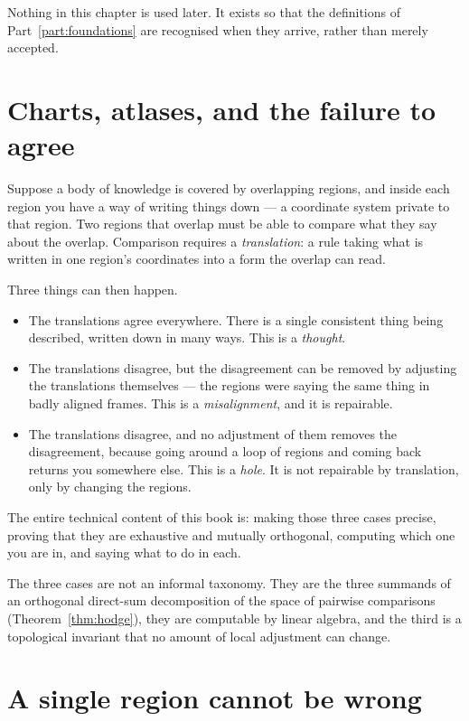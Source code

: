 Nothing in this chapter is used later. It exists so that the definitions of
Part~\ref{part:foundations} are recognised when they arrive, rather than
merely accepted.

\section{Charts, atlases, and the failure to agree}

\begin{intu}\Intu
Suppose a body of knowledge is covered by overlapping regions, and inside each
region you have a way of writing things down --- a coordinate system private
to that region. Two regions that overlap must be able to compare what they
say about the overlap. Comparison requires a \emph{translation}: a rule taking
what is written in one region's coordinates into a form the overlap can read.

Three things can then happen.
\begin{itemize}
  \item The translations agree everywhere. There is a single consistent thing
    being described, written down in many ways. This is a \emph{thought}.
  \item The translations disagree, but the disagreement can be removed by
    adjusting the translations themselves --- the regions were saying the same
    thing in badly aligned frames. This is a \emph{misalignment}, and it is
    repairable.
  \item The translations disagree, and no adjustment of them removes the
    disagreement, because going around a loop of regions and coming back
    returns you somewhere else. This is a \emph{hole}. It is not repairable by
    translation, only by changing the regions.
\end{itemize}
The entire technical content of this book is: making those three cases
precise, proving that they are exhaustive and mutually orthogonal, computing
which one you are in, and saying what to do in each.
\end{intu}

The three cases are not an informal taxonomy. They are the three summands of
an orthogonal direct-sum decomposition of the space of pairwise comparisons
(Theorem~\ref{thm:hodge}), they are computable by linear algebra, and the
third is a topological invariant that no amount of local adjustment can
change.

\section{A single region cannot be wrong}


